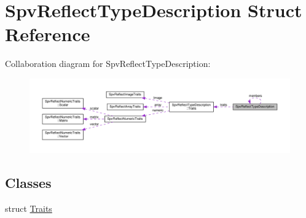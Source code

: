 \hypertarget{structSpvReflectTypeDescription}{}\section{Spv\+Reflect\+Type\+Description Struct Reference}
\label{structSpvReflectTypeDescription}


Collaboration diagram for Spv\+Reflect\+Type\+Description\+:\nopagebreak
\begin{figure}[H]
\begin{center}
\leavevmode
\includegraphics[width=350pt]{structSpvReflectTypeDescription__coll__graph}
\end{center}
\end{figure}
\subsection*{Classes}
\begin{DoxyCompactItemize}
\item 
struct \hyperlink{structSpvReflectTypeDescription_1_1Traits}{Traits}
\end{DoxyCompactItemize}
